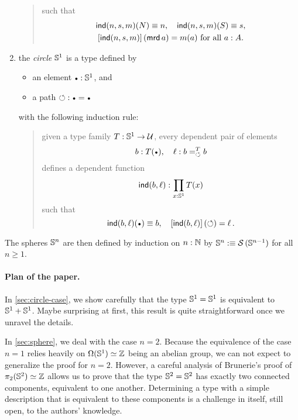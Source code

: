 \documentclass[english,a4]{article}
\renewcommand{\ap}[1]{\left[{#1}\right]}
\begin{document}
\begin{enumerate}
\begin{quote}
\begin{displaymath}
    \end{displaymath}
    such that
    \begin{gather*}
      \ind(n,s,m)(N) \jdeq n,\quad \ind(n,s,m)(S) \jdeq s,\\
      \ap{\ind(n,s,m)}(\mrd a) = m(a)\ \text{for all}\ a\from A.
    \end{gather*}
  \end{quote}
\item the {\em circle} ${{\mathbb S^{1}}}$ is a type defined by
  \begin{itemize}
  \item an element $\base \from \Sc$, and
  \item a path $\Sloop: \base = \base$
  \end{itemize}
  with the following induction rule:
  \begin{quote}
    given a type family $T: {{\mathbb S^{1}}} \to \mathcal{U}$, every dependent pair of
    elements
    \begin{displaymath}
      b\from T(\base), \quad \ell\from \pathover b T \Sloop b
    \end{displaymath}
    defines a dependent function
    \begin{displaymath}
      \operatorname{\mathsf{ind}}(b,\ell):\prod_{x: {{\mathbb S^{1}}}} T(x)
    \end{displaymath}
    such that
    \begin{displaymath}
      \ind(b,\ell)(\base) \jdeq b,\quad \ap{\ind(b,\ell)}(\Sloop) = \ell \,.
    \end{displaymath}
  \end{quote}
\end{enumerate}
The spheres ${\mathbb S^{n}}$ are then defined by induction on $n:\mathbb{N}$ by
${\mathbb S^{n}} \mathrel{\hbox{:}\mkern-5mu\equiv} \operatorname{\mathcal S} {({\mathbb S^{n-1}})}$ for all $n\geq 1$.

\paragraph{Plan of the paper.}%
In \cref{sec:circle-case}, we show carefully that the type ${{\mathbb S^{1}}} = {{\mathbb S^{1}}}$
is equivalent to ${{\mathbb S^{1}}} + {{\mathbb S^{1}}}$. Maybe surprising at first, this result
is quite straightforward once we unravel the details.

In \cref{sec:sphere}, we deal with the case $n=2$. Because the
equivalence of the case $n=1$ relies heavily on $\Omega({{\mathbb S^{1}}})\simeq \mathbb{Z}$
being an abelian group, we can not expect to generalize the proof for
$n=2$. However, a careful analysis of Brunerie's proof of
$\pi_2({{\mathbb S^{2}}}) \simeq \mathbb{Z}$ allows us to prove that the type ${{\mathbb S^{2}}}={{\mathbb S^{2}}}$ has
exactly two connected components, equivalent to one another. 
Determining a type with a simple description that is
equivalent to these components is a challenge in itself, still open,
to the authors' knowledge.
\end{document}
